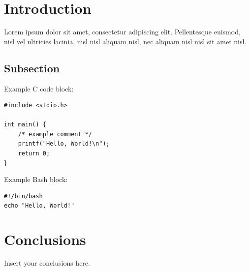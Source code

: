 \section{Introduction}

Lorem ipsum dolor sit amet, consectetur adipiscing elit. Pellentesque
euismod, nisl vel ultricies lacinia, nisl nisl aliquam nisl, nec
aliquam nisl nisl sit amet nisl.

\subsection{Subsection}

Example C code block:

\begin{lstlisting}[style=CStyle, caption={Example C code}]
#include <stdio.h>

int main() {
    /* example comment */
    printf("Hello, World!\n");
    return 0;
}
\end{lstlisting}

Example Bash block:

\begin{lstlisting}[style=BashStyle, caption={Example Bash script}]
#!/bin/bash
echo "Hello, World!"
\end{lstlisting}

\section{Conclusions}

Insert your conclusions here.
